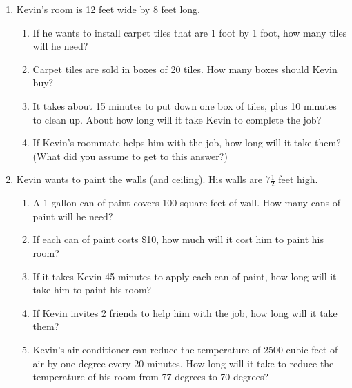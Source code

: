 \begin{enumerate}
\item Kevin’s room is 12 feet wide by 8 feet long.
\begin{enumerate}
  \item If he wants to install carpet tiles that are 1 foot by 1 foot, how many tiles will he need? \vspace{3cm}
  \item Carpet tiles are sold in boxes of 20 tiles. How many boxes should Kevin buy? \vspace{4cm}
  \item It takes about 15 minutes to put down one box of tiles, plus 10 minutes to clean up. About how long will it take Kevin to complete the job?  \vspace{5cm}
  \item If Kevin's roommate helps him with the job, how long will it take them? \\ 
  (What did you assume to get to this answer?) \vspace{3cm}
\end{enumerate}

\newpage
\item Kevin wants to paint the walls (and ceiling). His walls are $7 \frac{1}{2}$ feet high.
\begin{enumerate}
  \item A 1 gallon can of paint covers 100 square feet of wall. How many cans of paint will he need?  \vspace{5cm}
  \item If each can of paint costs \$10, how much will it cost him to paint his room? \vspace{2cm}
  \item If it takes Kevin 45 minutes to apply each can of paint, how long will it take him to paint his room? \vspace{2cm}
  \item If Kevin invites 2 friends to help him with the job, how long will it take them?  \vspace{2cm}
  \item Kevin’s air conditioner can reduce the temperature of 2500 cubic feet of air by one degree every 20 minutes. How long will it take to reduce the temperature of his room from 77 degrees to 70 degrees?
\end{enumerate}


\end{enumerate}
